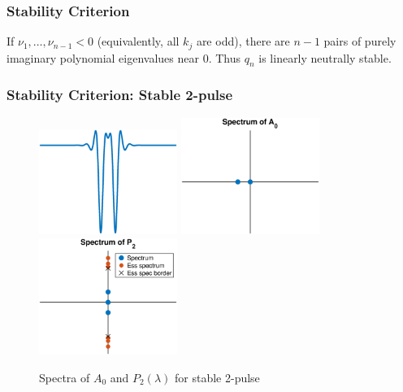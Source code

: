 \documentclass[16pt]{beamer}
\begin{document}
\begin{frame}
\frametitle{Stability Criterion}
\begin{corollary}[Kapitula et al., 2019]If $\nu_1, \dots, \nu_{n-1} < 0$ (equivalently, all $k_j$ are odd), there are $n - 1$ pairs of purely imaginary polynomial eigenvalues near 0. Thus $q_n$ is linearly neutrally stable.
\end{corollary}
\end{frame}

\begin{frame}
\frametitle{Stability Criterion: Stable 2-pulse}
\begin{figure}
\begin{center}
\includegraphics[width=4.5cm]{images/stable1.eps}
\includegraphics[width=4.5cm]{images/stable1A0.eps}
\includegraphics[width=4.5cm]{images/stable1spec.eps}
\caption{Spectra of $A_0$ and $P_2(\lambda)$ for stable 2-pulse}
\end{center}
\end{figure}
\end{frame}
\end{document}
